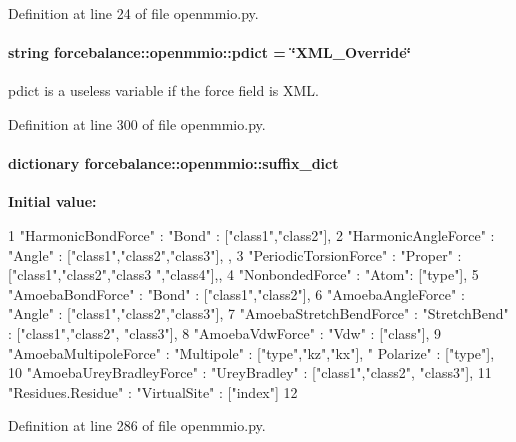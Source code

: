 \-Definition at line 24 of file openmmio.\-py.

\hypertarget{namespaceforcebalance_1_1openmmio_a665be6f97a91b103188288e8cd1de9a8}{
\paragraph[{pdict}]{\setlength{\rightskip}{0pt plus 5cm}string {\bf forcebalance\-::openmmio\-::pdict} = \char`\"{}\-X\-M\-L\-\_\-\-Override\char`\"{}}}\label{namespaceforcebalance_1_1openmmio_a665be6f97a91b103188288e8cd1de9a8}


pdict is a useless variable if the force field is \-X\-M\-L. 



\-Definition at line 300 of file openmmio.\-py.

\hypertarget{namespaceforcebalance_1_1openmmio_a2a12654c34f4f34e81f575f7b470bf8e}{
\paragraph[{suffix\-\_\-dict}]{\setlength{\rightskip}{0pt plus 5cm}dictionary {\bf forcebalance\-::openmmio\-::suffix\-\_\-dict}}}\label{namespaceforcebalance_1_1openmmio_a2a12654c34f4f34e81f575f7b470bf8e}
{\bfseries \-Initial value\-:}
\begin{DoxyCode}
1 { "HarmonicBondForce" : {"Bond" : ["class1","class2"]},
2                 "HarmonicAngleForce" : {"Angle" : ["class1","class2","class3"],
      },
3                 "PeriodicTorsionForce" : {"Proper" : ["class1","class2","class3
      ","class4"],},
4                 "NonbondedForce" : {"Atom": ["type"]},
5                 "AmoebaBondForce" : {"Bond" : ["class1","class2"]},
6                 "AmoebaAngleForce" : {"Angle" : ["class1","class2","class3"]},
7                 "AmoebaStretchBendForce" : {"StretchBend" : ["class1","class2",
      "class3"]},
8                 "AmoebaVdwForce" : {"Vdw" : ["class"]},
9                 "AmoebaMultipoleForce" : {"Multipole" : ["type","kz","kx"], "
      Polarize" : ["type"]},
10                 "AmoebaUreyBradleyForce" : {"UreyBradley" : ["class1","class2",
      "class3"]},
11                 "Residues.Residue" : {"VirtualSite" : ["index"]}
12                 }
\end{DoxyCode}


\-Definition at line 286 of file openmmio.\-py.

